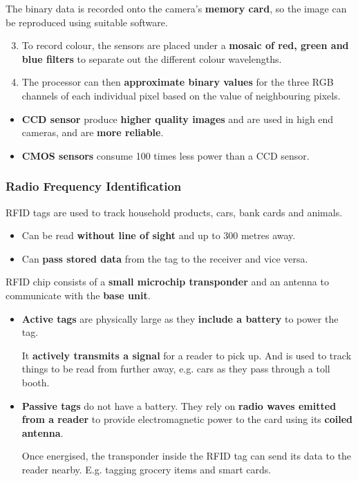 The binary data is recorded onto the camera's \textbf{memory card}, so the image can be reproduced using suitable software.

\begin{enumerate}
    \setcounter{enumi}{2}
    \item To record colour, the sensors are placed under a \textbf{mosaic of red, green and blue filters} to separate out the different colour wavelengths.
    \item The processor can then \textbf{approximate binary values} for the three RGB channels of each individual pixel based on the value of neighbouring pixels.
\end{enumerate}

\begin{itemize}
    \item \textbf{CCD sensor} produce \textbf{higher quality images} and are used in high end cameras, and are \textbf{more reliable}.
    \item \textbf{CMOS sensors} consume 100 times less power than a CCD sensor.
\end{itemize}

\subsubsection*{Radio Frequency Identification}

RFID tags are used to track household products, cars, bank cards and animals.

\begin{itemize}
    \item Can be read \textbf{without line of sight} and up to 300 metres away.
    \item Can \textbf{pass stored data} from the tag to the receiver and vice versa.
\end{itemize}

RFID chip consists of a \textbf{small microchip transponder} and an antenna to communicate with the \textbf{base unit}.

\begin{itemize}
    \item \textbf{Active tags} are physically large as they \textbf{include a battery} to power the tag.

        It \textbf{actively transmits a signal} for a reader to pick up. And is used to track things to be read from further away, e.g. cars as they pass through a toll booth.
    \item \textbf{Passive tags} do not have a battery. They rely on \textbf{radio waves emitted from a reader} to provide electromagnetic power to the card using its \textbf{coiled antenna}.

        Once energised, the transponder inside the RFID tag can send its data to the reader nearby. E.g. tagging grocery items and smart cards.
\end{itemize}

